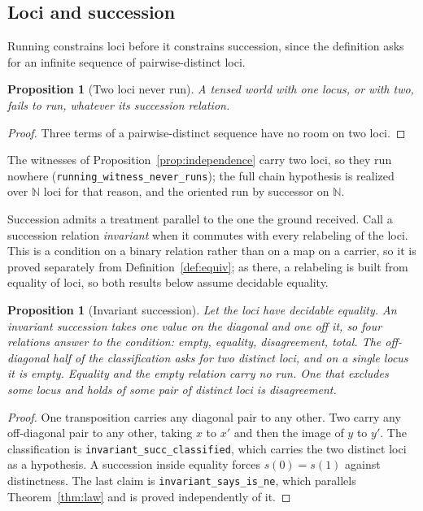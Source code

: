 \documentclass[11pt]{article}
\newtheorem{proposition}[theorem]{Proposition}
\newcommand{\lf}[1]{\texttt{#1}}
\begin{document}
\subsection{Loci and succession}
\label{sec:loci}

Running constrains loci before it constrains succession, since the definition asks for an infinite sequence of pairwise-distinct loci.

\begin{proposition}[Two loci never run]
\label{prop:loci}
A tensed world with one locus, or with two, fails to run, whatever its succession relation.
\end{proposition}

\begin{proof}
Three terms of a pairwise-distinct sequence have no room on two loci.
\end{proof}

The witnesses of Proposition~\ref{prop:independence} carry two loci, so they run nowhere (\lf{running\_witness\_never\_runs}); the full chain hypothesis is realized over $\mathbb{N}$ loci for that reason, and the oriented run by successor on $\mathbb{N}$.

Succession admits a treatment parallel to the one the ground received. Call a succession relation \emph{invariant} when it commutes with every relabeling of the loci. This is a condition on a binary relation rather than on a map on a carrier, so it is proved separately from Definition~\ref{def:equiv}; as there, a relabeling is built from equality of loci, so both results below assume decidable equality.

\begin{proposition}[Invariant succession]
\label{prop:invsucc}
Let the loci have decidable equality. An invariant succession takes one value on the diagonal and one off it, so four relations answer to the condition: empty, equality, disagreement, total. The off-diagonal half of the classification asks for two distinct loci, and on a single locus it is empty. Equality and the empty relation carry no run. One that excludes some locus and holds of some pair of distinct loci is disagreement.
\end{proposition}

\begin{proof}
One transposition carries any diagonal pair to any other. Two carry any off-diagonal pair to any other, taking $x$ to $x'$ and then the image of $y$ to $y'$. The classification is \lf{invariant\_succ\_classified}, which carries the two distinct loci as a hypothesis. A succession inside equality forces $s(0) = s(1)$ against distinctness. The last claim is \lf{invariant\_says\_is\_ne}, which parallels Theorem~\ref{thm:law} and is proved independently of it.
\end{proof}
\end{document}
